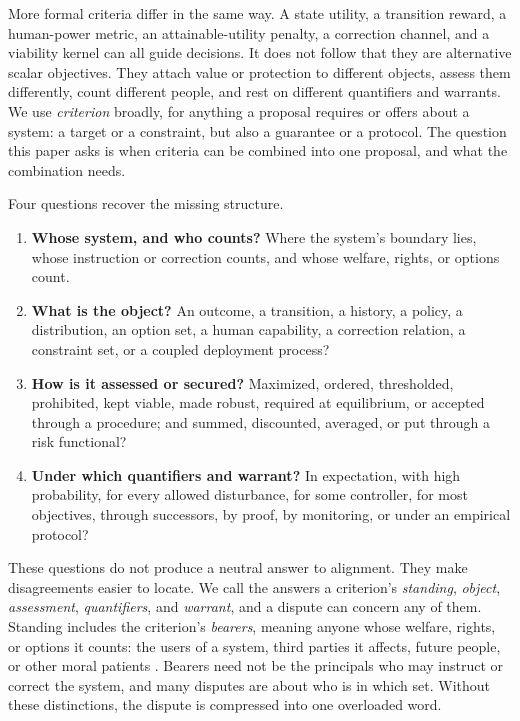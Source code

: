 \documentclass[11pt]{article}
\begin{document}
More formal criteria differ in the same way.
A state utility, a transition reward, a human-power metric, an attainable-utility penalty, a correction channel, and a viability kernel can all guide decisions.
It does not follow that they are alternative scalar objectives.
They attach value or protection to different objects, assess them differently, count different people, and rest on different quantifiers and warrants.
We use \emph{criterion} broadly, for anything a proposal requires or offers about a system: a target or a constraint, but also a guarantee or a protocol.
The question this paper asks is when criteria can be combined into one proposal, and what the combination needs.

Four questions recover the missing structure.
\begin{enumerate}[leftmargin=1.5em]
  \item \textbf{Whose system, and who counts?}
  Where the system's boundary lies, whose instruction or correction counts, and whose welfare, rights, or options count.
  \item \textbf{What is the object?}
  An outcome, a transition, a history, a policy, a distribution, an option set, a human capability, a correction relation, a constraint set, or a coupled deployment process?
  \item \textbf{How is it assessed or secured?}
  Maximized, ordered, thresholded, prohibited, kept viable, made robust, required at equilibrium, or accepted through a procedure; and summed, discounted, averaged, or put through a risk functional?
  \item \textbf{Under which quantifiers and warrant?}
  In expectation, with high probability, for every allowed disturbance, for some controller, for most objectives, through successors, by proof, by monitoring, or under an empirical protocol?
\end{enumerate}

These questions do not produce a neutral answer to alignment.
They make disagreements easier to locate.
We call the answers a criterion's \emph{standing}, \emph{object}, \emph{assessment}, \emph{quantifiers}, and \emph{warrant}, and a dispute can concern any of them.
Standing includes the criterion's \emph{bearers}, meaning anyone whose welfare, rights, or options it counts: the users of a system, third parties it affects, future people, or other moral patients \parencite{gabriel2020alignment,harris2026taxonomy}.
Bearers need not be the principals who may instruct or correct the system, and many disputes are about who is in which set.
Without these distinctions, the dispute is compressed into one overloaded word.
\end{document}
